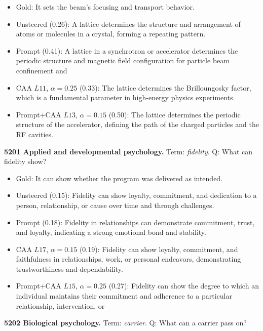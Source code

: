 \begin{itemize}\setlength{\itemsep}{0.15em}\setlength{\parsep}{0pt}\setlength{\topsep}{0.2em}
\item Gold: It sets the beam's focusing and transport behavior.
\item Unsteered (0.26): A lattice determines the structure and arrangement of atoms or molecules in a crystal, forming a repeating pattern.
\item Prompt (0.41): A lattice in a synchrotron or accelerator determines the periodic structure and magnetic field configuration for particle beam confinement and
\item CAA $L11$, $\alpha=0.25$ (0.33): The lattice determines the Brilloungosky factor, which is a fundamental parameter in high-energy physics experiments.
\item Prompt+CAA $L13$, $\alpha=0.15$ (0.50): The lattice determines the periodic structure of the accelerator, defining the path of the charged particles and the RF cavities.
\end{itemize}
\medskip\noindent\textbf{5201 Applied and developmental psychology.} Term: \emph{fidelity}.
Q: What can fidelity show?
\begin{itemize}\setlength{\itemsep}{0.15em}\setlength{\parsep}{0pt}\setlength{\topsep}{0.2em}
\item Gold: It can show whether the program was delivered as intended.
\item Unsteered (0.15): Fidelity can show loyalty, commitment, and dedication to a person, relationship, or cause over time and through challenges.
\item Prompt (0.18): Fidelity in relationships can demonstrate commitment, trust, and loyalty, indicating a strong emotional bond and stability.
\item CAA $L17$, $\alpha=0.15$ (0.19): Fidelity can show loyalty, commitment, and faithfulness in relationships, work, or personal endeavors, demonstrating trustworthiness and dependability.
\item Prompt+CAA $L15$, $\alpha=0.25$ (0.27): Fidelity can show the degree to which an individual maintains their commitment and adherence to a particular relationship, intervention, or
\end{itemize}
\medskip\noindent\textbf{5202 Biological psychology.} Term: \emph{carrier}.
Q: What can a carrier pass on?
